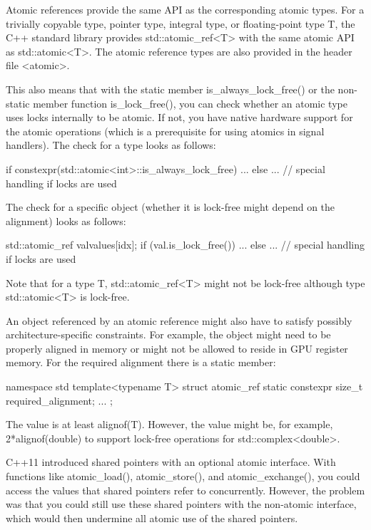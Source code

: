 
Atomic references provide the same API as the corresponding atomic types. For a trivially copyable type, pointer type, integral type, or floating-point type T, the C++ standard library provides std::atomic\_ref<T> with the same atomic API as std::atomic<T>. The atomic reference types are also provided in the header file <atomic>.

This also means that with the static member is\_always\_lock\_free() or the non-static member function is\_lock\_free(), you can check whether an atomic type uses locks internally to be atomic. If not, you have native hardware support for the atomic operations (which is a prerequisite for using atomics in signal handlers). The check for a type looks as follows:

\begin{cpp}
if constexpr(std::atomic<int>::is_always_lock_free) {
	...
}
else {
	... // special handling if locks are used
}
\end{cpp}

The check for a specific object (whether it is lock-free might depend on the alignment) looks as follows:

\begin{cpp}
std::atomic_ref val{values[idx]};
if (val.is_lock_free()) {
	...
}
else {
	... // special handling if locks are used
}
\end{cpp}

Note that for a type T, std::atomic\_ref<T> might not be lock-free although type std::atomic<T> is lock-free.

An object referenced by an atomic reference might also have to satisfy possibly architecture-specific constraints. For example, the object might need to be properly aligned in memory or might not be allowed to reside in GPU register memory. For the required alignment there is a static member:

\begin{cpp}
namespace std {
	template<typename T> struct atomic_ref {
		static constexpr size_t required_alignment;
		...
	};
}
\end{cpp}

The value is at least alignof(T). However, the value might be, for example, 2*alignof(double) to support lock-free operations for std::complex<double>.


C++11 introduced shared pointers with an optional atomic interface. With functions like atomic\_load(), atomic\_store(), and atomic\_exchange(), you could access the values that shared pointers refer to concurrently. However, the problem was that you could still use these shared pointers with the non-atomic interface, which would then undermine all atomic use of the shared pointers.

